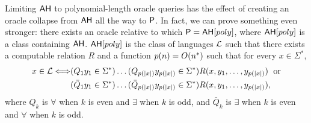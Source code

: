 Limiting $\mathsf{AH}$ to polynomial-length oracle queries has the effect of
creating an oracle collapse from $\mathsf{AH}$ all the way to $\mathsf{P}$. In fact, we
can prove something even stronger: there exists an oracle relative to which
$\mathsf{P}=\mathsf{AH}[poly]$, where $\mathsf{AH}[poly]$ is a class containing
$\mathsf{AH}$. 
$\mathsf{AH}[poly]$ is the class of languages $\mathcal{L}$ such that there exists a
computable relation $R$ and a function $p(n)=O(n^*)$ such that for every
$x\in\Sigma^*$,
\begin{align*}
x\in\mathcal{L}\Longleftrightarrow
&(Q_1y_1\in\Sigma^*)\ldots(Q_{p(|x|)}y_{p(|x|)}\in\Sigma^*)
R(x,y_1,\ldots,y_{p(|x|)})\hspace{6pt}\mathbin{\text{or}} \\
&(\bar Q_1y_1\in\Sigma^*)\ldots(\bar Q_{p(|x|)}y_{p(|x|)}\in\Sigma^*)
R(x,y_1,\ldots,y_{p(|x|)}),
\end{align*}
where $Q_k$ is $\forall$ when $k$ is even and $\exists$ when $k$ is odd, and
$\bar Q_k$ is $\exists$ when $k$ is even and $\forall$ when $k$ is odd.

